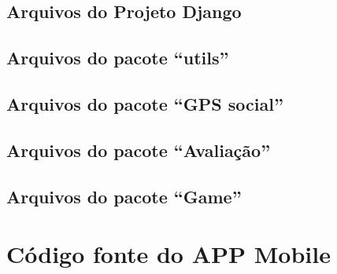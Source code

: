 \section{Arquivos do Projeto Django}


\clearpage
\section{Arquivos do pacote ``utils''}





\section{Arquivos do pacote ``GPS social''}




\clearpage
\section{Arquivos do pacote ``Avaliação''}




\clearpage
\section{Arquivos do pacote ``Game''}





\chapter{Código fonte do APP Mobile}\label{anexo:sources-mobile}
